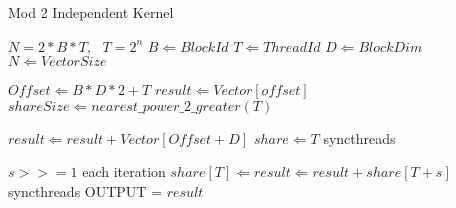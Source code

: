 \documentclass[conference]{IEEEtran}
\begin{document}
\begin{algorithm}
  \caption{Mod 2 Independent Kernel}
  \label{alg:mod2}
  \begin{algorithmic}
    \REQUIRE $N=2*B*T$,~ $T=2^n$
    \STATE $B \Leftarrow BlockId$
    \STATE $T \Leftarrow ThreadId$
    \STATE $D \Leftarrow BlockDim$
    \STATE $N \Leftarrow Vector Size$
    
    \STATE $Offset \Leftarrow B * D * 2 + T$
    \STATE $result \Leftarrow Vector[offset]$
    \STATE $shareSize \Leftarrow nearest\_power\_2\_greater(T)$
    
        \STATE $result \Leftarrow result + Vector[Offset + D]$
    \ENDIF
    \STATE $share \Leftarrow T$
    \STATE syncthreads
    
    \STATE $s >>= 1$ each iteration
            \STATE $share[T] \Leftarrow result \Leftarrow result + share[T + s]$
        \ENDIF
        \STATE syncthreads
    \ENDFOR
      \STATE OUTPUT = $result$
    \ENDIF
    \ENDFOR
  \end{algorithmic}
\end{algorithm}



%
%
\end{document}
